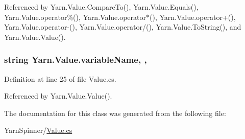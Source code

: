 Referenced by Yarn.\-Value.\-Compare\-To(), Yarn.\-Value.\-Equals(), Yarn.\-Value.\-operator\%(), Yarn.\-Value.\-operator$\ast$(), Yarn.\-Value.\-operator+(), Yarn.\-Value.\-operator-\/(), Yarn.\-Value.\-operator/(), Yarn.\-Value.\-To\-String(), and Yarn.\-Value.\-Value().

\hypertarget{a00167_a8ee2b09b7d28eaf97bf63c74d0023bfd}{
\subsubsection[{variable\-Name}]{\setlength{\rightskip}{0pt plus 5cm}string Yarn.\-Value.\-variable\-Name\hspace{0.3cm}{\ttfamily [get]}, {\ttfamily [set]}, {\ttfamily [package]}}}\label{a00167_a8ee2b09b7d28eaf97bf63c74d0023bfd}


Definition at line 25 of file Value.\-cs.



Referenced by Yarn.\-Value.\-Value().



The documentation for this class was generated from the following file\-:\begin{DoxyCompactItemize}
\item 
Yarn\-Spinner/\hyperlink{a00293}{Value.\-cs}\end{DoxyCompactItemize}
